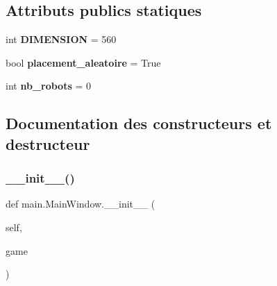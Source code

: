 \subsection*{Attributs publics statiques}
\begin{DoxyCompactItemize}
\item 
\mbox{\label{classmain_1_1MainWindow_a15e75bbd8a9684532615c7f5e926dd9e}} 
int {\bfseries D\+I\+M\+E\+N\+S\+I\+ON} = 560
\item 
\mbox{\label{classmain_1_1MainWindow_a669de576e29e0cba21864576b54cf07a}} 
bool {\bfseries placement\+\_\+aleatoire} = True
\item 
\mbox{\label{classmain_1_1MainWindow_a1c9eeb17286bfe6ca3dd736a8242fbe5}} 
int {\bfseries nb\+\_\+robots} = 0
\end{DoxyCompactItemize}


\subsection{Documentation des constructeurs et destructeur}
\mbox{\label{classmain_1_1MainWindow_a1a032331db3e5bbe3267696548ae95df}} 
\subsubsection{\texorpdfstring{\+\_\+\+\_\+init\+\_\+\+\_\+()}{\_\_init\_\_()}}
{\footnotesize\ttfamily def main.\+Main\+Window.\+\_\+\+\_\+init\+\_\+\+\_\+ (\begin{DoxyParamCaption}\item[{}]{self,  }\item[{}]{game }\end{DoxyParamCaption})}

